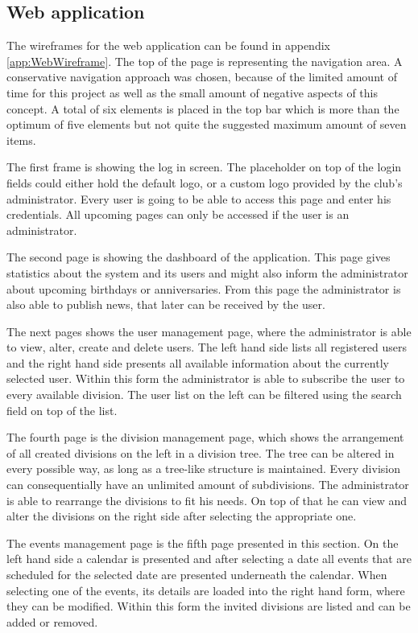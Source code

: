 \subsection{Web application}

The wireframes for the web application can be found in appendix \vref{app:WebWireframe}. The top of the page is representing the navigation area. A conservative navigation approach was chosen, because of the limited amount of time for this project as well as the small amount of negative aspects of this concept. A total of six elements is placed in the top bar which is more than the optimum of five elements but not quite the suggested maximum amount of seven items.

The first frame is showing the log in screen. The placeholder on top of the login fields could either hold the default logo, or a custom logo provided by the club's administrator. Every user is going to be able to access this page and enter his credentials. All upcoming pages can only be accessed if the user is an administrator.

The second page is showing the dashboard of the application. This page gives statistics about the system and its users and might also inform the administrator about upcoming birthdays or anniversaries. From this page the administrator is also able to publish news, that later can be received by the user.

The next pages shows the user management page, where the administrator is able to view, alter, create and delete users. The left hand side lists all registered users and the right hand side presents all available information about the currently selected user. Within this form the administrator is able to subscribe the user to every available division. The user list on the left can be filtered using the search field on top of the list.

The fourth page is the division management page, which shows the arrangement of all created divisions on the left in a division tree. The tree can be altered in every possible way, as long as a tree-like structure is maintained. Every division can consequentially have an unlimited amount of subdivisions. The administrator is able to rearrange the divisions to fit his needs. On top of that he can view and alter the divisions on the right side after selecting the appropriate one. 

The events management page is the fifth page presented in this section. On the left hand side a calendar is presented and after selecting a date all events that are scheduled for the selected date are presented underneath the calendar. When selecting one of the events, its details are loaded into the right hand form, where they can be modified. Within this form the invited divisions are listed and can be added or removed.

